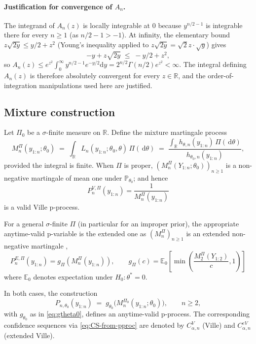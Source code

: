 \documentclass[12pt, a4paper]{report}
\newcommand{\E}{\mathbb{E}}
\newcommand{\Prob}{\mathbb{P}}
\newcommand{\dd}{\,\mathrm{d}}
\newcommand{\diff}{\mathrm{d}}
\newcommand{\1}{\mathbf{1}}
\begin{document}
\paragraph{Justification for convergence of $A_n$.} The integrand of $A_n(z)$ is locally integrable at $0$ because $y^{n/2-1}$ is integrable there for every $n\geq 1$ (as $n/2-1>-1$). At
infinity, the elementary bound $z\sqrt{2y}\leq y/2 + z^{2}$ (Young's inequality applied to $z\sqrt{2y}=\sqrt{2}z\cdot\sqrt{y}$) gives
\[
-y + z\sqrt{2y} \;\leq\; -y/2 + z^{2},
\]
so $A_n(z)\leq e^{z^{2}}\int_{0}^{\infty}y^{n/2-1}e^{-y/2}\diff y
= 2^{n/2}\Gamma(n/2)e^{z^{2}}<\infty$. The integral defining
$A_n(z)$ is therefore absolutely convergent for every $z\in\mathbb{R}$, and the order-of-integration manipulations used here are justified.


\subsection{Mixture construction}\label{ssec:mixture}

Let \(\Pi_0\) be a \(\sigma\)-finite measure on \(\mathbb{R}\). Define the
mixture martingale process
\begin{equation}\label{eq:Mn-def}
  M_n^{\Pi}(y_{1:n};\theta_0)
  \;=\;\int_\mathbb{R} L_n(y_{1:n};\theta_0,\theta)\,\Pi(\dd\theta)
  \;=\;\frac{\int_\mathbb{R} h_{\theta,n}(y_{1:n})\,\Pi(\dd\theta)}
            {h_{\theta_0,n}(y_{1:n})},
\end{equation}
provided the integral is finite. When \(\Pi\) is proper,
\((M_n^{\Pi}(Y_{1:n};\theta_0))_{n\geq 1}\) is a non-negative
martingale of mean one under \(\Prob_{\theta_0}\); and hence
\[
P_n^{V,\Pi}(y_{1:n})=\frac{1}{M_n^\Pi(y_{1:n})}
\]
is a valid Ville p-process.

For a general $\sigma$-finite $\Pi$ (in particular for an improper prior), the appropriate anytime-valid p-variable is the extended one as $(M_n^\Pi)_{n\geq 1}$ is an extended non-negative martingale \citep{wang2025extended},
\[
P_n^{E,\Pi}(y_{1:n})=g_\Pi(M_n^\Pi(y_{1:n})),
\qquad
g_\Pi(c)=\E_{0}\!\left[\min\!\left(\frac{M_2^\Pi(Y_{1:2})}{c},1\right)\right]
\]
where $\E_0$ denotes expectation under $H_0:\theta^*=0$.

In both
cases, the construction
\begin{equation}\label{eq:p-from-M}
  P_{n,\theta_0}(y_{1:n})
  \;=\;
  g_{\theta_0}\!\bigl(M_n^{\Pi_0}(y_{1:n};\theta_0)\bigr),
  \qquad n\geq 2,
\end{equation}
with \(g_{\theta_0}\) as in \eqref{eq:gtheta0}, defines an anytime-valid
p-process. The corresponding confidence sequences via
\eqref{eq:CS-from-pproc} are denoted by \(C^V_{\alpha,n}\) (Ville) and
\(C^{eV}_{\alpha,n}\) (extended Ville).
\end{document}
